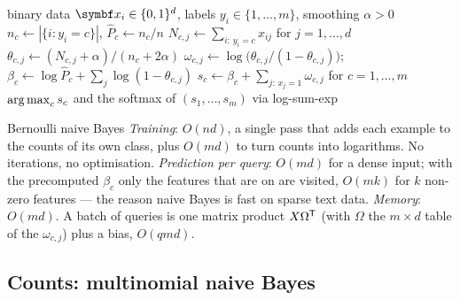 \documentclass[11pt]{article}
\begin{document}
\begin{algorithm}[H]
\caption{Bernoulli naive Bayes with Laplace smoothing}\label{alg:bnb}
\footnotesize
\begin{algorithmic}[1]
\Require binary data $\x_i \in \{0, 1\}^d$, labels $y_i \in \{1, \dots, m\}$, smoothing $\alpha > 0$
    \State $n_c \gets |\{i : y_i = c\}|$, \quad $\hat P_c \gets n_c / n$
    \State $N_{c,j} \gets \sum_{i:\, y_i = c} x_{ij}$ for $j = 1, \dots, d$ 
    \State $\theta_{c,j} \gets (N_{c,j} + \alpha)/(n_c + 2\alpha)$ \Comment{\eqref{eq:laplace}}
    \State $\omega_{c,j} \gets \log\big(\theta_{c,j}/(1 - \theta_{c,j})\big)$; \quad $\beta_c \gets \log \hat P_c + \sum_j \log(1 - \theta_{c,j})$
  \EndFor
\EndFunction
{}
  \State $s_c \gets \beta_c + \sum_{j:\, x_j = 1} \omega_{c,j}$ for $c = 1, \dots, m$ 
  \State \Return $\operatorname*{arg\,max}_c s_c$ and the softmax of $(s_1, \dots, s_m)$ via log-sum-exp
\EndFunction
\end{algorithmic}
\end{algorithm}

\begin{runtime}{Bernoulli naive Bayes}
\emph{Training}: $O(nd)$, a single pass that adds each example to the counts of its own class, plus $O(md)$ to turn
counts into logarithms. No iterations, no optimisation. \emph{Prediction per query}: $O(md)$ for a dense input; with the
precomputed $\beta_c$ only the features that are on are visited, $O(mk)$ for $k$ non-zero features --- the reason
naive Bayes is fast on sparse text data. \emph{Memory}: $O(md)$. A batch of queries is one matrix product
$X \Omega^{\mathsf{T}}$ (with $\Omega$ the $m \times d$ table of the $\omega_{c,j}$) plus a bias, $O(qmd)$.
\end{runtime}

\subsection{Counts: multinomial naive Bayes}\label{sec:multinomial}
\end{document}
